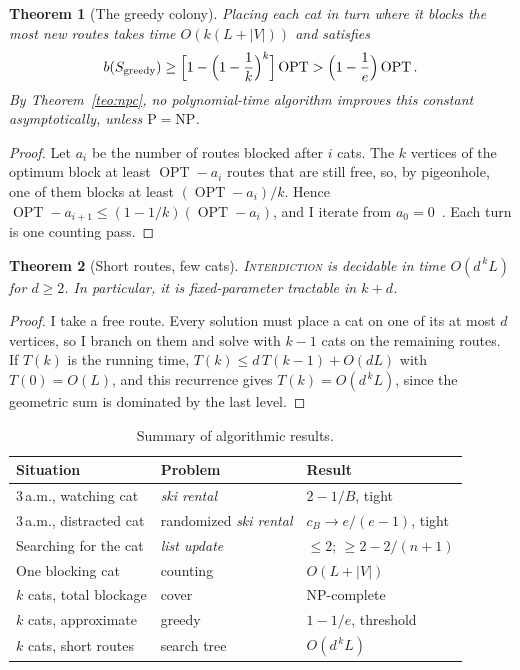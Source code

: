 \documentclass[11pt,a4paper]{article}
\theoremstyle{plain}
\newtheorem{teorema}{Theorem}[section]
\theoremstyle{definition}
\theoremstyle{remark}
\numberwithin{equation}{section}
\newcommand{\OPT}{\operatorname{OPT}}
\newcommand{\prob}[1]{\textnormal{\textsc{#1}}}
\begin{document}
\begin{teorema}[The greedy colony]\label{teo:voraz}
Placing each cat in turn where it blocks the most new routes takes time $O(k(L+|V|))$ and satisfies
\begin{equation}
  b(S_{\mathrm{greedy}})\ge\Bigl[1-\Bigl(1-\frac1k\Bigr)^{k}\Bigr]\OPT>\Bigl(1-\frac1e\Bigr)\OPT.
\end{equation}
By Theorem~\ref{teo:npc}, no polynomial-time algorithm improves this constant asymptotically, unless $\mathrm{P}=\mathrm{NP}$.
\end{teorema}

\begin{proof}
Let $a_i$ be the number of routes blocked after $i$ cats. The $k$ vertices of the optimum block at least $\OPT-a_i$ routes that are still free, so, by pigeonhole, one of them blocks at least $(\OPT-a_i)/k$. Hence $\OPT-a_{i+1}\le(1-1/k)(\OPT-a_i)$, and I iterate from $a_0=0$~\cite{nemhauser}. Each turn is one counting pass.
\end{proof}

\begin{teorema}[Short routes, few cats]\label{teo:fpt}
\prob{Interdiction} is decidable in time $O(d^{\,k}L)$ for $d\ge 2$. In particular, it is fixed-parameter tractable in $k+d$.
\end{teorema}

\begin{proof}
I take a free route. Every solution must place a cat on one of its at most $d$ vertices, so I branch on them and solve with $k-1$ cats on the remaining routes. If $T(k)$ is the running time, $T(k)\le d\,T(k-1)+O(dL)$ with $T(0)=O(L)$, and this recurrence gives $T(k)=O(d^{\,k}L)$, since the geometric sum is dominated by the last level.
\end{proof}

\begin{table}[ht]
\centering
\caption{Summary of algorithmic results.}\label{tab:algoritmos}
\begin{tabular}{lll}
\toprule
Situation & Problem & Result \\
\midrule
3\,a.m., watching cat & \emph{ski rental} & $2-1/B$, tight \\
3\,a.m., distracted cat & randomized \emph{ski rental} & $c_B\to e/(e-1)$, tight \\
Searching for the cat & \emph{list update} & $\le 2$; $\ge 2-2/(n+1)$ \\
One blocking cat & counting & $O(L+|V|)$ \\
$k$ cats, total blockage & cover & NP-complete \\
$k$ cats, approximate & greedy & $1-1/e$, threshold \\
$k$ cats, short routes & search tree & $O(d^{\,k}L)$ \\
\bottomrule
\end{tabular}
\end{table}
\end{document}
